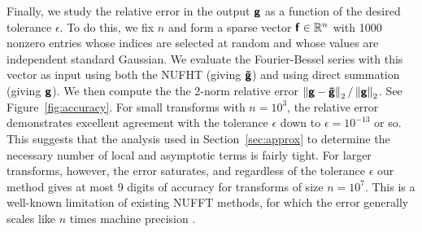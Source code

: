 Finally, we study the relative error in the output $\vct{g}$ as a function of
the desired tolerance $\epsilon$. To do this, we fix $n$ and form a sparse
vector $\vct{f} \in \R^n$ with 1000 nonzero entries whose indices are selected
at random and whose values are independent standard Gaussian. We evaluate the
Fourier-Bessel series with this vector as input using both the NUFHT (giving
$\vct{\tilde{g}}$) and using direct summation (giving $\vct{g}$). We then
compute the the 2-norm relative error $\norm[2]{\vct{g} - \vct{\tilde{g}}} /
\norm[2]{\vct{g}}$. See Figure~\ref{fig:accuracy}. For small transforms with
$n=10^3$, the relative error demonstrates excellent agreement with the tolerance
$\epsilon$ down to $\epsilon = 10^{-13}$ or so. This suggests that the analysis
used in Section~\ref{sec:approx} to determine the necessary number of local and
asymptotic terms is fairly tight. For larger transforms, however, the error
saturates, and regardless of the tolerance $\epsilon$ our method gives at most 9
digits of accuracy for transforms of size $n=10^7$. This is a well-known
limitation of existing NUFFT methods, for which the error generally scales like
$n$ times machine precision \cite[Remark 9]{barnett2019parallel}.


